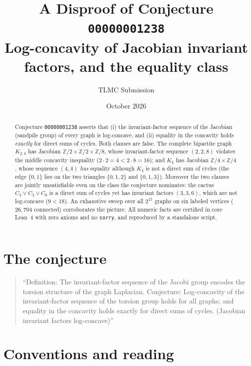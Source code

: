 \documentclass[11pt]{article}
\title{A Disproof of Conjecture \texttt{00000001238}\\
\large Log-concavity of Jacobian invariant factors, and the equality class}
\author{TLMC Submission}
\date{October 2026}
\theoremstyle{definition}
\begin{document}
\maketitle

\begin{abstract}
Conjecture \texttt{00000001238} asserts that (i) the invariant-factor sequence of the
Jacobian (sandpile group) of every graph is log-concave, and (ii) equality in the
concavity holds \emph{exactly} for direct sums of cycles.  Both clauses are false.
The complete bipartite graph $K_{2,4}$ has Jacobian
$\mathbb{Z}/2 \times \mathbb{Z}/2 \times \mathbb{Z}/8$, whose invariant-factor
sequence $(2,2,8)$ violates the middle concavity inequality ($2\cdot 2 = 4 < 2\cdot
8 = 16$); and $K_4$ has Jacobian $\mathbb{Z}/4 \times \mathbb{Z}/4$, whose sequence
$(4,4)$ \emph{has} equality although $K_4$ is not a direct sum of cycles (the edge
$\{0,1\}$ lies on the two triangles $\{0,1,2\}$ and $\{0,1,3\}$).  Moreover the two
clauses are jointly unsatisfiable even on the class the conjecture nominates: the
cactus $C_3 \vee C_3 \vee C_6$ is a direct sum of cycles yet has invariant factors
$(3,3,6)$, which are not log-concave ($9 < 18$).  An exhaustive sweep over all
$2^{15}$ graphs on six labeled vertices ($26{,}704$ connected) corroborates the
picture.  All numeric facts are certified in core Lean~4 with zero axioms and no
\texttt{sorry}, and reproduced by a standalone script.
\end{abstract}

\section{The conjecture}

\begin{quote}
``Definition: The invariant-factor sequence of the Jacobi group encodes the torsion
structure of the graph Laplacian. Conjecture: Log-concavity of the invariant-factor
sequence of the torsion group holds for all graphs; and equality in the concavity
holds exactly for direct sums of cycles. (Jacobian invariant factors log-concave)''
\end{quote}

\section{Conventions and reading}\label{sec:conv}
\end{document}
